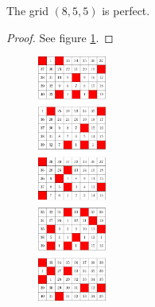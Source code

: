 \begin{con}
The grid $(8,5,5)$ is perfect.
\end{con}

\begin{proof}
See figure \ref{fig:5x8x5_numbered_heatmap}.
\end{proof}

\begin{figure}[]
\centering
\includegraphics[width=0.2\textwidth]{figures/7/5x8x5_numbered_heatmap.pdf}
\caption{}
\label{fig:5x8x5_numbered_heatmap}
\end{figure}





